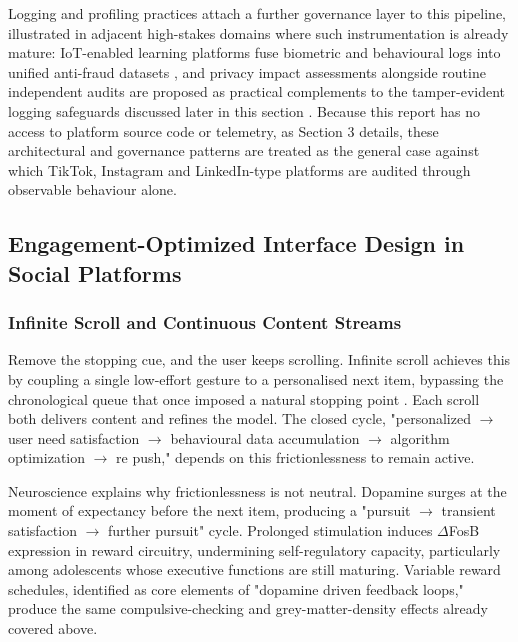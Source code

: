 \documentclass[11pt]{article}
\begin{document}
Logging and profiling practices attach a further governance layer to this pipeline, illustrated in adjacent high-stakes domains where such instrumentation is already mature: IoT-enabled learning platforms fuse biometric and behavioural logs into unified anti-fraud datasets \parencites[5]{0751607}, and privacy impact assessments alongside routine independent audits are proposed as practical complements to the tamper-evident logging safeguards discussed later in this section \parencites[6]{5988547}. Because this report has no access to platform source code or telemetry, as Section 3 details, these architectural and governance patterns are treated as the general case against which TikTok, Instagram and LinkedIn-type platforms are audited through observable behaviour alone.

\subsection{Engagement-Optimized Interface Design in Social Platforms}

\subsubsection{Infinite Scroll and Continuous Content Streams}
\label{sec:infinite_scroll_streams} Remove the stopping cue, and the user keeps scrolling. Infinite scroll achieves this by coupling a single low-effort gesture to a personalised next item, bypassing the chronological queue that once imposed a natural stopping point \parencites[2]{8958037}[3]{8958037}. Each scroll both delivers content and refines the model. The closed cycle, "personalized $\rightarrow$ user need satisfaction $\rightarrow$ behavioural data accumulation $\rightarrow$ algorithm optimization $\rightarrow$ re push," depends on this frictionlessness to remain active.

Neuroscience explains why frictionlessness is not neutral. Dopamine surges at the moment of expectancy before the next item, producing a "pursuit $\rightarrow$ transient satisfaction $\rightarrow$ further pursuit" cycle. Prolonged stimulation induces $\Delta$FosB expression \parencites[3]{8958037}[2]{8958037} in reward circuitry, undermining self-regulatory capacity, particularly among adolescents whose executive functions are still maturing. Variable reward schedules, identified \parencites[2]{3303310} as core elements of "dopamine driven feedback loops," produce the same compulsive-checking and grey-matter-density effects already covered above.
\end{document}
